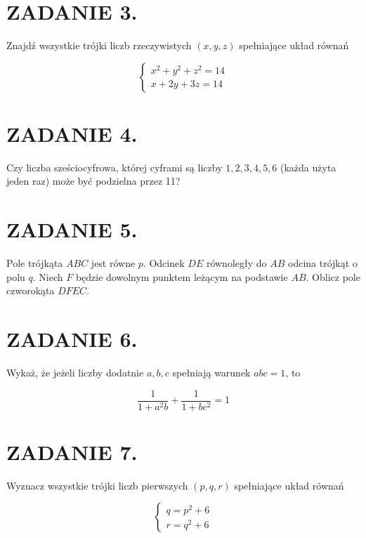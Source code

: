 \documentclass[10pt]{article}
\begin{document}
\section*{ZADANIE 3.}
Znajdź wszystkie trójki liczb rzeczywistych \((x, y, z)\) spełniające układ równań

\[
\left\{\begin{array}{l}
x^{2}+y^{2}+z^{2}=14 \\
x+2 y+3 z=14
\end{array}\right.
\]

\section*{ZADANIE 4.}
Czy liczba sześciocyfrowa, której cyframi są liczby \(1,2,3,4,5,6\) (każda użyta jeden raz) może być podzielna przez 11?

\section*{ZADANIE 5.}
Pole trójkąta \(A B C\) jest równe \(p\). Odcinek \(D E\) równoległy do \(A B\) odcina trójkąt o polu \(q\). Niech \(F\) będzie dowolnym punktem leżącym na podstawie \(A B\). Oblicz pole czworokąta \(D F E C\).

\section*{ZADANIE 6.}
Wykaż, że jeżeli liczby dodatnie \(a, b, c\) spełniają warunek \(a b c=1\), to

\[
\frac{1}{1+a^{2} b}+\frac{1}{1+b c^{2}}=1
\]

\section*{ZADANIE 7.}
Wyznacz wszystkie trójki liczb pierwszych \((p, q, r)\) spełniające układ równań

\[
\left\{\begin{array}{l}
q=p^{2}+6 \\
r=q^{2}+6
\end{array}\right.
\]
\end{document}
